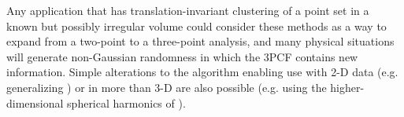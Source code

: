 Any application that has translation-invariant clustering of a point set in a known but possibly irregular volume could consider these methods as a way to expand from a two-point to a three-point analysis, and many physical situations will generate non-Gaussian randomness in which the 3PCF contains new information.  Simple alterations to the algorithm  enabling use with 2-D data (e.g. generalizing \cite{SE3ptalg}) or in more than 3-D are also possible (e.g. using the higher-dimensional spherical harmonics of \cite{Frye2012}).

